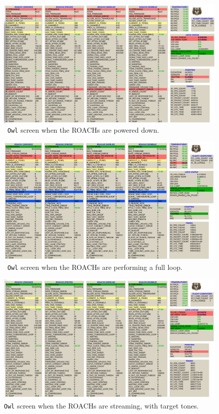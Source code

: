 \begin{figure}
\includegraphics[width=\linewidth,keepaspectratio]{./figures/software/roaches_off}
\caption[~OWL screen when the ROACHs are powered down.]{~\texttt{Owl} screen when the ROACHs are powered down.}
\label{fig:roaches off screen}
\end{figure}

\begin{figure}
\includegraphics[width=\linewidth,keepaspectratio]{./figures/software/full_loop}
\caption[~OWL screen when the ROACHs are performing a full loop.]{~\texttt{Owl} screen when the ROACHs are performing a full loop.}
\label{fig:doing full loop screen}
\end{figure}

\begin{figure}
\includegraphics[width=\linewidth,keepaspectratio]{./figures/software/has_targ_tones}
\caption[~OWL screen when the ROACHs are streaming, with target tones.]{\texttt{Owl} screen when the ROACHs are streaming, with target tones.}
\label{fig:has targ tones screen}
\end{figure}

